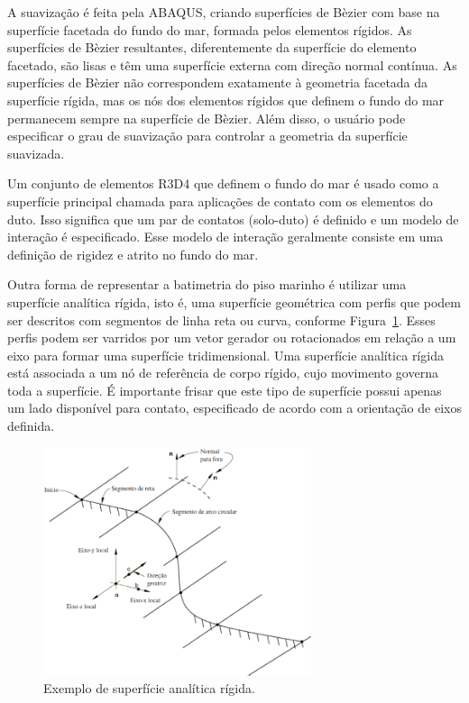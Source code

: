 A suavização é feita pela ABAQUS, criando superfícies de Bèzier com base na superfície facetada do fundo do mar, formada pelos elementos rígidos. As superfícies de Bèzier resultantes, diferentemente da superfície do elemento facetado, são lisas e têm uma superfície externa com direção normal contínua. As superfícies de Bèzier não correspondem exatamente à geometria facetada da superfície rígida, mas os nós dos elementos rígidos que definem o fundo do mar permanecem sempre na superfície de Bèzier. Além disso, o usuário pode especificar o grau de suavização para controlar a geometria da superfície suavizada.

Um conjunto de elementos R3D4 que definem o fundo do mar é usado como a superfície principal chamada para aplicações de contato com os elementos do duto. Isso significa que um par de contatos (solo-duto) é definido e um modelo de interação é especificado. Esse modelo de interação geralmente consiste em uma definição de rigidez e atrito no fundo do mar.




Outra forma de representar a batimetria do piso marinho é utilizar uma superfície analítica rígida, isto é, uma superfície geométrica com perfis que podem ser descritos com segmentos de linha reta ou curva, conforme Figura~\ref{fig:superficie_analitica}. Esses perfis podem ser varridos por um vetor gerador ou rotacionados em relação a um eixo para formar uma superfície tridimensional. Uma superfície analítica rígida está associada a um nó de referência de corpo rígido, cujo movimento governa toda a superfície. É importante frisar que este tipo de superfície possui apenas um lado disponível para contato, especificado de acordo com a orientação de eixos definida.

\begin{figure}[!ht]
    \centering
    \caption{Exemplo de superfície analítica rígida.}\label{fig:superficie_analitica}
    \includegraphics[width=0.7\textwidth]{imagens/superficie_analitica}
\end{figure}

